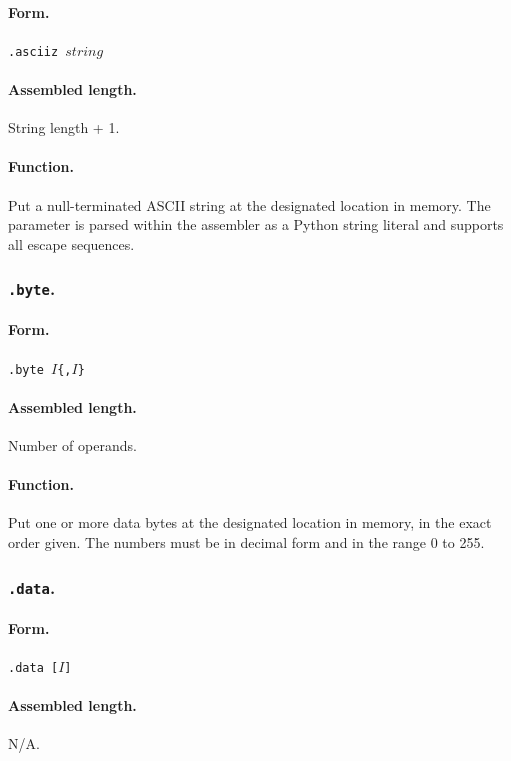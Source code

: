\documentclass[12pt,english,twoside]{report}
\def\code{\texttt}
\begin{document}
\paragraph{Form.}
\code{.asciiz $\mathit{string}$}

\paragraph{Assembled length.} String length + 1.

\paragraph{Function.}
Put a null-terminated ASCII string at the designated location in
memory. The parameter is parsed within the assembler as a Python
string literal and supports all escape sequences.

\subsubsection*{\label{Asm_byte}\code{.byte}.}
\paragraph{Form.}
\code{.byte $I$\{,$I$\}}

\paragraph{Assembled length.} Number of operands.

\paragraph{Function.}
Put one or more data bytes at the designated location in memory, in
the exact order given. The numbers must be in decimal form and in the
range 0 to 255.

\subsubsection*{\label{Asm_data}\code{.data}.}
\paragraph{Form.}
\code{.data [$I$]}

\paragraph{Assembled length.} N/A.
\end{document}
